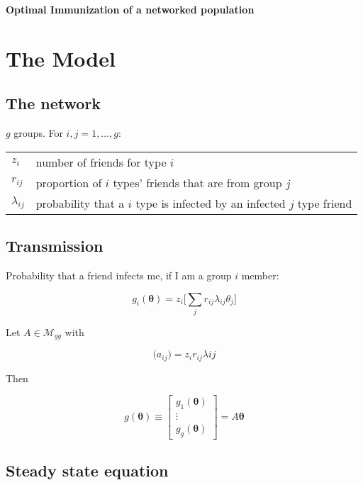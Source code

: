 \documentclass[12pt]{article}
\begin{document}
\begin{center}
\textbf{Optimal Immunization of a networked population}
\end{center}

\tableofcontents
\cite{308_Gal_Rogers}

\section{The Model}

\subsection{The network}

$g$ groups. For $i,j=1, \dots, g$:

\begin{tabular}{ll}
$z_i$ & number of friends for type $i$ \\
$r_{ij}$ & proportion of $i$ types' friends that are from group $j$ \\
$\lambda_{ij}$ & probability that a $i$ type is infected by an infected $j$ type friend \\
\end{tabular}



\subsection{Transmission}

Probability that a friend infects me, if I am a group $i$ member:

\[ g_i(\bm{\theta}) = z_i \Big[\sum_{j} r_{ij} \lambda_{ij} \theta_j  \Big] \]



Let $A \in \mathcal{M}_{gg}$ with 

\[\big(  a_{ij} \big) = z_i r_{ij} \lambda{ij} \]

Then

\[ g(\bm{\theta}) \equiv \begin{bmatrix} g_1(\bm{\theta}) \\ \vdots \\ g_g(\bm{\theta})  \end{bmatrix} = A \bm{\theta} \]



\subsection{Steady state equation}
\end{document}
